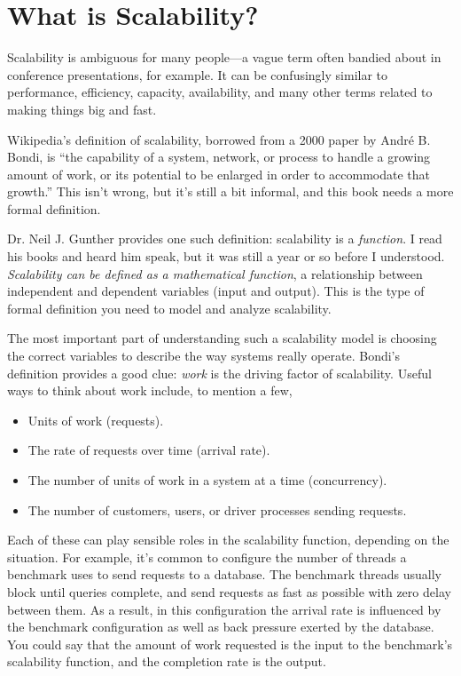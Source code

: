 \documentclass{vivid_layout}
\begin{document}
\newpage

\section{What is Scalability?}

Scalability is ambiguous for many people---a vague term often bandied about in
conference presentations, for example. It can be confusingly similar to
performance, efficiency, capacity, availability, and many other terms related to
making things big and fast.

Wikipedia's definition of scalability, borrowed from a 2000 paper by Andr\'e B.
Bondi, is ``the capability of a system, network, or process to handle a growing
amount of work, or its potential to be enlarged in order to accommodate that
growth.'' This isn't wrong, but it's still a bit informal, and this book needs a
more formal definition.

Dr. Neil J. Gunther provides one such definition: scalability is a {\itshape
function}. I read his books and heard him speak, but it was still a year or so
before I understood. {\itshape Scalability can be defined as a mathematical
function}, a relationship between independent and dependent variables (input and
output). This is the type of formal definition you need to model and analyze
scalability.

The most important part of understanding such a scalability model is choosing
the correct variables to describe the way systems really operate.  Bondi's
definition provides a good clue: {\itshape work} is the driving factor of
scalability. Useful ways to think about work include, to mention a few,

\begin{itemize}
\item Units of work (requests).
\item The rate of requests over time (arrival rate).
\item The number of units of work in a system at a time (concurrency).
\item The number of customers, users, or driver processes sending requests.
\end{itemize}

Each of these can play sensible roles in the scalability function, depending on
the situation. For example, it's common to configure the number of threads a
benchmark uses to send requests to a database. The benchmark threads usually
block until queries complete, and send requests as fast as possible with zero
delay between them. As a result, in this configuration the arrival rate is
influenced by the benchmark configuration as well as back pressure exerted by
the database.  You could say that the amount of work requested is the input to
the benchmark's scalability function, and the completion rate is the output.
\end{document}
